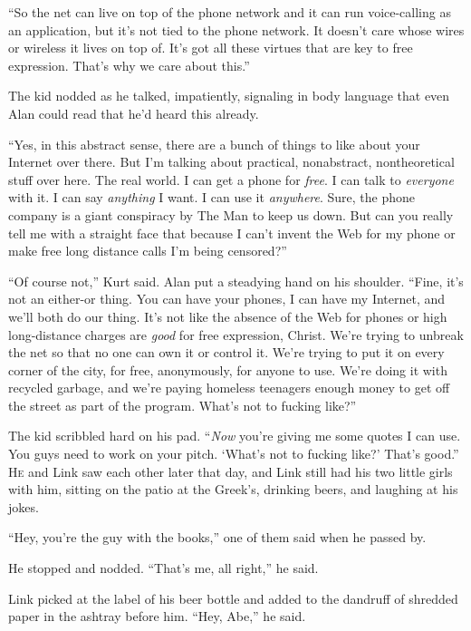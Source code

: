 ``So the net can live on top of the phone network and it can run
voice-calling as an application, but it's not tied to the phone
network.  It doesn't care whose wires or wireless it lives on top of. 
It's got all these virtues that are key to free expression.  That's
why we care about this.''

The kid nodded as he talked, impatiently, signaling in body language
that even Alan could read that he'd heard this already.

``Yes, in this abstract sense, there are a bunch of things to like
about your Internet over there.  But I'm talking about practical,
nonabstract, nontheoretical stuff over here.  The real world.  I can
get a phone for \textit{free}.  I can talk to \textit{everyone} with
it.  I can say \textit{anything} I want.  I can use it
\textit{anywhere}.  Sure, the phone company is a giant conspiracy by
The Man to keep us down.  But can you really tell me with a straight
face that because I can't invent the Web for my phone or make free
long distance calls I'm being censored?''

``Of course not,'' Kurt said.  Alan put a steadying hand on his
shoulder.  ``Fine, it's not an either-or thing.  You can have your
phones, I can have my Internet, and we'll both do our thing.  It's not
like the absence of the Web for phones or high long-distance charges
are \textit{good} for free expression, Christ.  We're trying to
unbreak the net so that no one can own it or control it.  We're trying
to put it on every corner of the city, for free, anonymously, for
anyone to use.  We're doing it with recycled garbage, and we're paying
homeless teenagers enough money to get off the street as part of the
program.  What's not to fucking like?''

The kid scribbled hard on his pad.  ``\textit{Now} you're giving me
some quotes I can use.  You guys need to work on your pitch.  `What's
not to fucking like?' That's good.''
\\
\lettrine[lines=3, lhang=.5, nindent=0pt, findent=2pt]{H}{e} and Link saw each other later that day, and Link still had his two
little girls with him, sitting on the patio at the Greek's, drinking
beers, and laughing at his jokes.

``Hey, you're the guy with the books,'' one of them said when he
passed by. 

He stopped and nodded.  ``That's me, all right,'' he said.

Link picked at the label of his beer bottle and added to the dandruff
of shredded paper in the ashtray before him.  ``Hey, Abe,'' he said.

